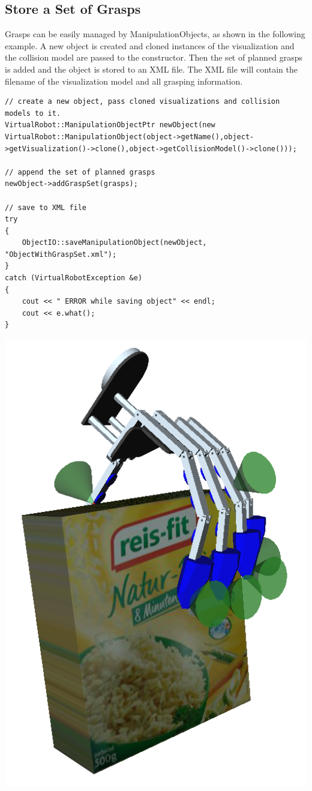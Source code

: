 \subsection{Store a Set of Grasps}
Grasps can be easily managed by ManipulationObjects, as shown in the following example. A new object is created and cloned instances of the visualization and the collision model are passed to the constructor. Then the set of planned grasps is added and the object is stored to an XML file. The XML file will contain the filename of the visualization model and all grasping information.
\begin{lstlisting}
// create a new object, pass cloned visualizations and collision models to it.
VirtualRobot::ManipulationObjectPtr newObject(new VirtualRobot::ManipulationObject(object->getName(),object->getVisualization()->clone(),object->getCollisionModel()->clone()));

// append the set of planned grasps
newObject->addGraspSet(grasps);

// save to XML file
try
{
    ObjectIO::saveManipulationObject(newObject, "ObjectWithGraspSet.xml");
}
catch (VirtualRobotException &e)
{
    cout << " ERROR while saving object" << endl;
    cout << e.what();
}
\end{lstlisting}
\includegraphics[width=\textwidth]{Grasp1}

